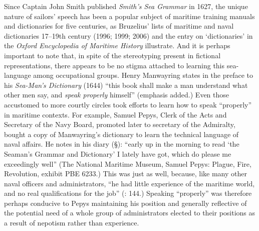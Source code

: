 Since Captain John Smith published \textit{Smith’s Sea Grammar} in 1627, the unique nature of sailors’ speech has been a popular subject of maritime training manuals and dictionaries for five centuries, as Bruzelius’ lists of maritime and naval dictionaries 17--19th century (1996; 1999; 2006) and the entry on ‘dictionaries’ in the \textit{Oxford Encyclopedia of Maritime History} \citep{Hattendorf2007} illustrate. And it is perhaps important to note that, in spite of the stereotyping present in fictional representations, there appears to be no stigma attached to learning this sea-language among occupational groups. Henry Manwayring states in the preface to his \textit{Sea-Man’s Dictionary} (1644) “this book shall make a man understand what other men say, and \textit{speak properly} himself” (emphasis added.) Even those accustomed to more courtly circles took efforts to learn how to speak “properly” in maritime contexts. For example, Samuel Pepys, Clerk of the Acts and Secretary of the Navy Board, promoted later to secretary of the Admiralty, bought a copy of Manwayring’s dictionary to learn the technical language of naval affairs. He notes in his diary (§\citealt{March1661}): “early up in the morning to read ‘the Seaman’s Grammar and Dictionary’ I lately have got, which do please me exceedingly well” (The National Maritime Museum, Samuel Pepys: Plague, Fire, Revolution, exhibit PBE 6233.)  This was just as well, because, like many other naval officers and administrators, “he had little experience of the maritime world, and no real qualifications for the job” (\citealt{Lincoln2015}: 144.) Speaking “properly” was therefore perhaps conducive to Pepys maintaining his position and generally reflective of the potential need of a whole group of administrators elected to their positions as a result of nepotism rather than experience. 

